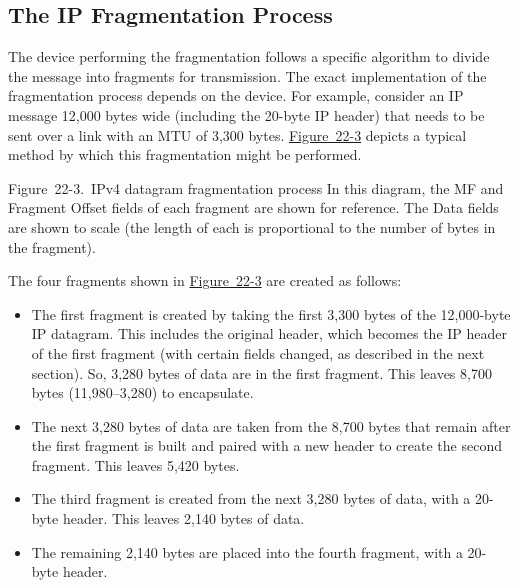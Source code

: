 \documentclass[b5paper,11pt]{memoir}
\begin{document}
\subsection[The IP Fragmentation
Process]{\texorpdfstring{\protect\hypertarget{ch22s02.htmlux5cux23the_ip_fragmentation_process}{}{}The
IP Fragmentation Process}{The IP Fragmentation Process}}

\protect\hypertarget{ch22s02.htmlux5cux23idx-CHP-22-0808}{}{}The device
performing the fragmentation follows a specific algorithm to divide the
message into fragments for transmission. The exact implementation of the
fragmentation process depends on the device. For example, consider an IP
message 12,000 bytes wide (including the 20-byte IP header) that needs
to be sent over a link with an MTU of 3,300 bytes.
\protect\hyperlink{ch22s02.htmlux5cux23ipv4_datagram_fragmentation_process_in_t}{Figure~22-3}
depicts a typical method by which this fragmentation might be performed.

\protect\hypertarget{ch22s02.htmlux5cux23ipv4_datagram_fragmentation_process_in_t}{}{}

\protect\hypertarget{ch22s02.htmlux5cux23I_mediaobject8_d1e23900}{}{}

Figure~22-3.~IPv4 datagram fragmentation process In this diagram, the MF
and Fragment Offset fields of each fragment are shown for reference. The
Data fields are shown to scale (the length of each is proportional to
the number of bytes in the fragment).

The four fragments shown in
\protect\hyperlink{ch22s02.htmlux5cux23ipv4_datagram_fragmentation_process_in_t}{Figure~22-3}
are created as follows:

\begin{itemize}
\item
  The first fragment is created by taking the first 3,300 bytes of the
  12,000-byte IP datagram. This includes the original header, which
  becomes the IP header of the first fragment (with certain fields
  changed, as described in the next section). So, 3,280 bytes of data
  are in the first fragment. This leaves 8,700 bytes (11,980--3,280) to
  encapsulate.
\item
  The next 3,280 bytes of data are taken from the 8,700 bytes that
  remain after the first fragment is built and paired with a new header
  to create the second fragment. This leaves 5,420 bytes.
\item
  The third fragment is created from the next 3,280 bytes of data, with
  a 20-byte header. This leaves 2,140 bytes of data.
\item
  The remaining 2,140 bytes are placed into the fourth fragment, with a
  20-byte header.
\end{itemize}
\end{document}
